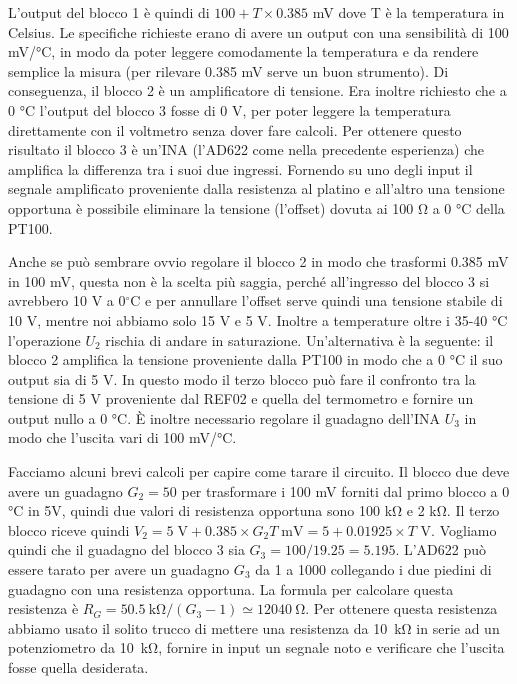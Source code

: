L'output del blocco 1 è quindi di $100 + T\times0.385$ mV dove T è la temperatura in Celsius.
Le specifiche richieste erano di avere un output con una sensibilità di 100 mV/\si{\celsius}, 
in modo da poter leggere comodamente la temperatura e da rendere semplice la misura (per rilevare
0.385 mV serve un buon strumento). Di conseguenza, il blocco 2 è un amplificatore di tensione.
Era inoltre richiesto che a 0 \si{\celsius} l'output del blocco 3 fosse di 0 V, per poter leggere
la temperatura direttamente con il voltmetro senza dover fare calcoli. Per ottenere
questo risultato il blocco 3 è un'INA (l'AD622 come nella precedente esperienza) che amplifica
la differenza tra i suoi due ingressi. Fornendo su uno degli input il segnale amplificato proveniente
dalla resistenza al platino e all'altro una tensione opportuna è possibile eliminare la tensione
(l'offset) dovuta ai 100 \si{\ohm} a 0 \si{\celsius} della PT100.

Anche se può sembrare ovvio regolare il blocco 2 in modo che trasformi 0.385 mV in 100 mV, questa
non è la scelta più saggia, perché all'ingresso del blocco 3 si avrebbero 10 V a 0$^\circ$C e per annullare l'offset
serve quindi una tensione stabile di 10 V, mentre noi abbiamo solo 15 V e 5 V. Inoltre a temperature oltre i 35-40 \si{\celsius}
l'operazione $U_2$ rischia di andare in saturazione. Un'alternativa è la seguente:
il blocco 2 amplifica la tensione proveniente dalla PT100 in modo che a 0 \si{\celsius} il suo output sia
di 5 V. In questo modo il terzo blocco può fare il confronto tra la tensione di 5 V proveniente dal REF02 e quella
del termometro e fornire un output nullo a 0 \si{\celsius}. È inoltre necessario regolare il guadagno dell'INA $U_3$
in modo che l'uscita vari di 100 mV/\si{\celsius}.

Facciamo alcuni brevi calcoli per capire come tarare il circuito. Il blocco due deve avere un guadagno $G_2 = 50$
per trasformare i 100 mV forniti dal primo blocco a 0 \si{\celsius} in 5V, quindi due valori di resistenza opportuna
sono 100 \si{\kilo\ohm} e 2 \si{\kilo\ohm}. Il terzo blocco riceve quindi
$V_2 = 5 \;\si{\volt} + 0.385 \times G_2T\; \si{\milli\volt} = 5 + 0.01925 \times T$ V.
Vogliamo quindi che il guadagno del blocco 3 sia $G_3 = 100/19.25 = 5.195$. L'AD622 può essere tarato per avere
un guadagno $G_3$ da 1 a 1000 collegando i due piedini di guadagno con una resistenza opportuna. La formula per
calcolare questa resistenza è $R_G = \SI{50.5}{\kilo\ohm}/(G_3 - 1) \simeq \SI{12040}{\ohm}$. Per ottenere questa
resistenza abbiamo usato il solito trucco di mettere una resistenza da \SI{10}{\kilo\ohm} in serie ad un potenziometro
da \SI{10}{\kilo\ohm}, fornire in input un segnale noto e verificare che l'uscita fosse quella desiderata.


